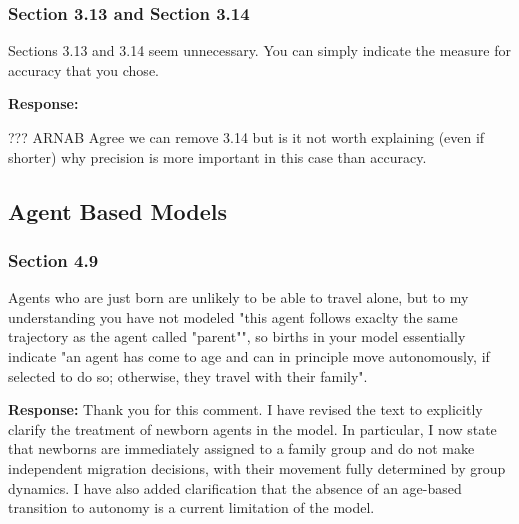 \documentclass[11pt,a4paper]{article}
\begin{document}
\vspace{0.5cm}

\subsubsection*{Section 3.13 and Section 3.14}

\begin{reviewbox}
Sections 3.13 and 3.14 seem unnecessary. You can simply indicate the measure for accuracy that you chose.
\end{reviewbox}

\textbf{Response:}

??? ARNAB Agree we can remove 3.14 but is it not worth explaining (even if shorter) why precision is more
important in this case than accuracy.

\vspace{0.5cm}

\begin{updatebox}

\end{updatebox}

\vspace{0.5cm}

\subsection*{Agent Based Models}

\subsubsection*{Section 4.9}

\begin{reviewbox}
Agents who are just born are unlikely to be able to travel alone, but to my understanding you have not modeled "this agent follows exaclty the same trajectory as the agent called "parent"", so births in your model essentially indicate "an agent has come to age and can in principle move autonomously, if selected to do so; otherwise, they travel with their family".
\end{reviewbox}

\textbf{Response:}
Thank you for this comment. I have revised the text to explicitly clarify the treatment of newborn agents in the model. In particular, I now state that newborns are immediately assigned to a family group and do not make independent migration decisions, with their movement fully determined by group dynamics. I have also added clarification that the absence of an age-based transition to autonomy is a current limitation of the model.
\end{document}
